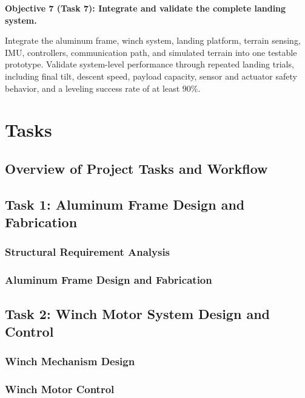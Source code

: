\documentclass{engr1000j-s2}
\begin{document}
\textbf{Objective 7 (Task 7): Integrate and validate the complete landing system.}

Integrate the aluminum frame, winch system, landing platform, terrain sensing, IMU, controllers, communication path, and simulated terrain into one testable prototype. Validate system-level performance through repeated landing trials, including final tilt, descent speed, payload capacity, sensor and actuator safety behavior, and a leveling success rate of at least $90\%$.



\newpage

\section{Tasks}
\label{sec:tasks}

\subsection{Overview of Project Tasks and Workflow}



\newpage

\subsection{Task 1: Aluminum Frame Design and Fabrication}

\subsubsection{Structural Requirement Analysis}

\subsubsection{Aluminum Frame Design and Fabrication}



\newpage

\subsection{Task 2: Winch Motor System Design and Control}

\subsubsection{Winch Mechanism Design}

\subsubsection{Winch Motor Control}
\end{document}
